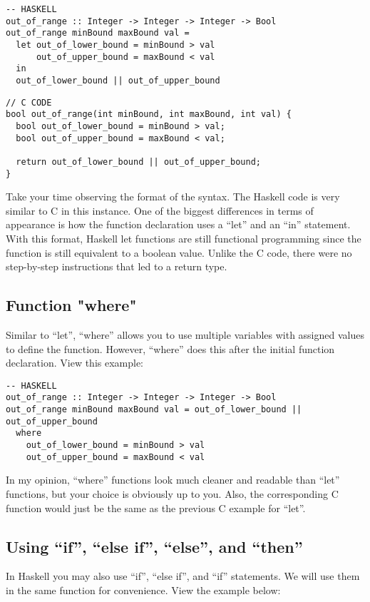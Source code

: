 \documentclass{article}
\begin{document}
\begin{lstlisting}[style=HaskellStyle]
-- HASKELL
out_of_range :: Integer -> Integer -> Integer -> Bool
out_of_range minBound maxBound val =
  let out_of_lower_bound = minBound > val
      out_of_upper_bound = maxBound < val
  in
  out_of_lower_bound || out_of_upper_bound
\end{lstlisting}

\begin{lstlisting}[style=CStyle]
// C CODE
bool out_of_range(int minBound, int maxBound, int val) {
  bool out_of_lower_bound = minBound > val;
  bool out_of_upper_bound = maxBound < val;

  return out_of_lower_bound || out_of_upper_bound;
}
\end{lstlisting}

\medskip\noindent
Take your time observing the format of the syntax. The Haskell code is very similar to C in this instance. One of the biggest differences in terms of appearance is how the function declaration uses a “let” and an “in” statement. With this format, Haskell let functions are still functional programming since the function is still equivalent to a boolean value. Unlike the C code, there were no step-by-step instructions that led to a return type.

\subsection{Function "where"}
\medskip\noindent
Similar to “let”, “where” allows you to use multiple variables with assigned values to define the function. However, “where” does this after the initial function declaration. View this example:

\begin{lstlisting}[style=HaskellStyle]
-- HASKELL
out_of_range :: Integer -> Integer -> Integer -> Bool
out_of_range minBound maxBound val = out_of_lower_bound || out_of_upper_bound
  where
    out_of_lower_bound = minBound > val
    out_of_upper_bound = maxBound < val
\end{lstlisting}

\medskip\noindent
In my opinion, “where” functions look much cleaner and readable than “let” functions, but your choice is obviously up to you. Also, the corresponding C function would just be the same as the previous C example for “let”.

\subsection{Using “if”, “else if”, “else”, and “then”}
\medskip\noindent
In Haskell you may also use “if”, “else if”, and “if” statements. We will use them in the same function for convenience. View the example below:
\end{document}
